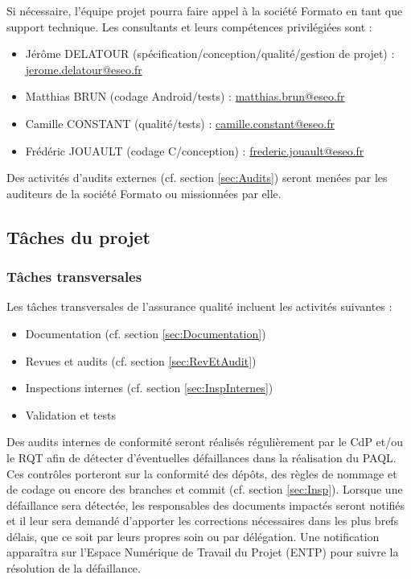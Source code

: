 \documentclass[a4paper,11pt,titlepage]{article}
\newcounter{subsubsubsection}[subsubsection]
\begin{document}
 \label{sec:ConAud} %
Si nécessaire, l'équipe projet pourra faire appel à la société Formato en tant que support technique. Les consultants et leurs compétences privilégiées sont :
\begin{itemize}
    \item Jérôme DELATOUR (spécification/conception/qualité/gestion de projet) : \href{mailto:jerome.delatour@eseo.fr}{jerome.delatour@eseo.fr}
    \item Matthias BRUN (codage Android/tests) : \href{mailto:matthias.brun@eseo.fr}{matthias.brun@eseo.fr}
    \item Camille CONSTANT (qualité/tests) : \href{mailto:camille.constant@eseo.fr}{camille.constant@eseo.fr}
    \item Frédéric JOUAULT (codage C/conception) : \href{mailto:frederic.jouault@eseo.fr}{frederic.jouault@eseo.fr}
\end{itemize}
Des activités d'audits externes (cf. section \ref{sec:Audits}) seront menées par les auditeurs de la société Formato ou missionnées par elle.
\subsection{Tâches du projet}%
\subsubsection{Tâches transversales}%
Les tâches transversales de l'assurance qualité incluent les activités suivantes :
\begin{itemize}
    \item Documentation (cf. section \ref{sec:Documentation})
    \item Revues et audits (cf. section \ref{sec:RevEtAudit})
    \item Inspections internes (cf. section \ref{sec:InspInternes})
    \item Validation et tests
\end{itemize}

 \label{sec:InspInternes} %
Des audits internes de conformité seront réalisés régulièrement par le CdP et/ou le RQT afin de détecter d'éventuelles défaillances dans la réalisation du PAQL. Ces contrôles porteront sur la conformité des dépôts, des règles de nommage et de codage ou encore des branches et commit (cf. section \ref{sec:Insp}). Lorsque une défaillance sera détectée, les responsables des documents impactés seront notifiés et il leur sera demandé d'apporter les corrections nécessaires dans les plus brefs délais, que ce soit par leurs propres soin ou par délégation. Une notification apparaîtra sur l'Espace Numérique de Travail du Projet (ENTP) pour suivre la résolution de la défaillance.\\
\end{document}
